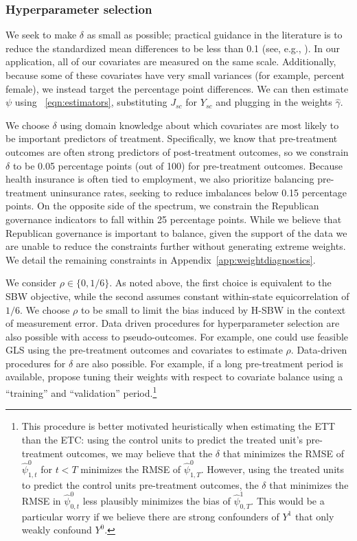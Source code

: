 \documentclass[aoas]{imsart}
\theoremstyle{plain}
\theoremstyle{remark}
\begin{document}
\subsubsection{Hyperparameter selection} \label{ssec:delta}

We seek to make $\delta$ as small as possible; practical guidance in the literature is to reduce the standardized mean differences to be less than 0.1 (see, e.g., \cite{zhang2019balance}). In our application, all of our covariates are measured on the same scale. Additionally, because some of these covariates have very small variances (for example, percent female), we instead target the percentage point differences. We can then estimate $\psi$ using ~\eqref{eqn:estimators}, substituting $J_{sc}$ for $Y_{sc}$ and plugging in the weights $\hat{\gamma}$.

We choose $\delta$ using domain knowledge about which covariates are most likely to be important predictors of treatment. Specifically, we know that pre-treatment outcomes are often strong predictors of post-treatment outcomes, so we constrain $\delta$ to be 0.05 percentage points (out of 100) for pre-treatment outcomes. Because health insurance is often tied to employment, we also prioritize balancing pre-treatment uninsurance rates, seeking to reduce imbalances below 0.15 percentage points. On the opposite side of the spectrum, we constrain the Republican governance indicators to fall within 25 percentage points. While we believe that Republican governance is important to balance, given the support of the data we are unable to reduce the constraints further without generating extreme weights. We detail the remaining constraints in Appendix~\ref{app:weightdiagnostics}. 

We consider $\rho \in \{0, 1/6\}$. As noted above, the first choice is equivalent to the SBW objective, while the second assumes constant within-state equicorrelation of $1/6$. We choose $\rho$ to be small to limit the bias induced by H-SBW in the context of measurement error. Data driven procedures for hyperparameter selection are also possible with access to pseudo-outcomes. For example, one could use feasible GLS using the pre-treatment outcomes and covariates to estimate $\rho$. Data-driven procedures for $\delta$ are also possible. For example, if a long pre-treatment period is available, \cite{abadie2015comparative} propose tuning their weights with respect to covariate balance using a ``training'' and ``validation'' period.\footnote{This procedure is better motivated heuristically when estimating the ETT than the ETC: using the control units to predict the treated unit's pre-treatment outcomes, we may believe that the $\delta$ that minimizes the RMSE of $\hat{\psi}^0_{1, t}$ for $t < T$ minimizes the RMSE of $\hat{\psi}^0_{1, T}$. However, using the treated units to predict the control units pre-treatment outcomes, the $\delta$ that minimizes the RMSE in $\hat{\psi}^0_{0, t}$ less plausibly minimizes the bias of $\hat{\psi}^1_{0, T}$. This would be a particular worry if we believe there are strong confounders of $Y^1$ that only weakly confound $Y^0$.}
\end{document}
